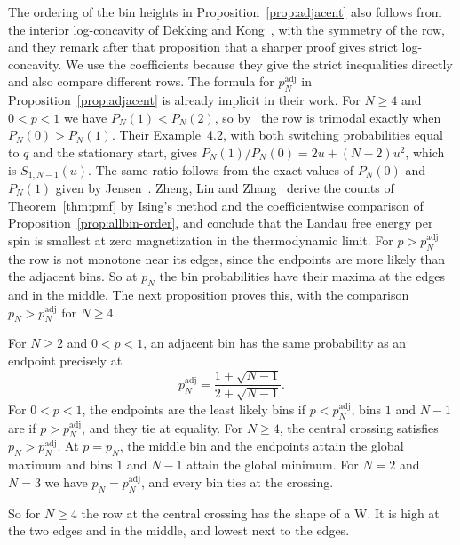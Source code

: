The ordering of the bin heights in Proposition~\ref{prop:adjacent} also
follows from the interior log-concavity of Dekking and
Kong~\cite[Proposition~4.3]{dekkingkong2011}, with the symmetry of the row,
and they remark after that proposition that a sharper proof gives strict
log-concavity. We use the coefficients because they give the strict
inequalities directly and also compare different rows. The formula for
$p_N^{\mathrm{adj}}$ in Proposition~\ref{prop:adjacent} is already implicit in
their work. For $N\ge4$ and $0<p<1$ we have $P_N(1)<P_N(2)$, so
by~\cite[Theorem~4.1]{dekkingkong2011} the row is trimodal exactly when
$P_N(0)>P_N(1)$. Their Example~4.2, with both switching probabilities equal
to $q$ and the stationary start, gives $P_N(1)/P_N(0)=2u+(N-2)u^2$, which is
$S_{1,N-1}(u)$. The same ratio follows from the exact values of $P_N(0)$ and
$P_N(1)$ given by Jensen~\cite[Eq.~(A.1)]{jensen2013}. Zheng, Lin and Zhang~\cite[Eqs.~(7) to (9) of the arXiv version]{zheng2026}
derive the counts of Theorem~\ref{thm:pmf} by Ising's method and the
coefficientwise comparison of Proposition~\ref{prop:allbin-order}, and
conclude that the Landau free energy per spin is smallest at zero
magnetization in the thermodynamic limit. For $p>p_N^{\mathrm{adj}}$ the row is not monotone near its edges, since the
endpoints are more likely than the adjacent bins. So at $p_N$ the bin
probabilities have their
maxima at the edges and in the middle. The next proposition proves this, with
the comparison $p_N>p_N^{\mathrm{adj}}$ for $N\ge4$.

\begin{proposition}\label{prop:adjacent}
For $N\ge2$ and $0<p<1$, an adjacent bin has the same probability as an
endpoint precisely at
\[
p_N^{\mathrm{adj}}=\frac{1+\sqrt{N-1}}{2+\sqrt{N-1}}.
\]
For $0<p<1$, the endpoints are the least likely bins if
$p<p_N^{\mathrm{adj}}$, bins $1$ and $N-1$ are if $p>p_N^{\mathrm{adj}}$, and
they tie at equality. For $N\ge4$, the central crossing satisfies
$p_N>p_N^{\mathrm{adj}}$. At $p=p_N$, the middle bin and the endpoints attain the
global maximum and bins $1$ and $N-1$ attain the global minimum. For $N=2$
and $N=3$ we have $p_N=p_N^{\mathrm{adj}}$, and every bin ties at the crossing.
\end{proposition}

So for $N\ge4$ the row at the central crossing has the shape of a W. It is high at the two
edges and in the middle, and lowest next to the edges.

